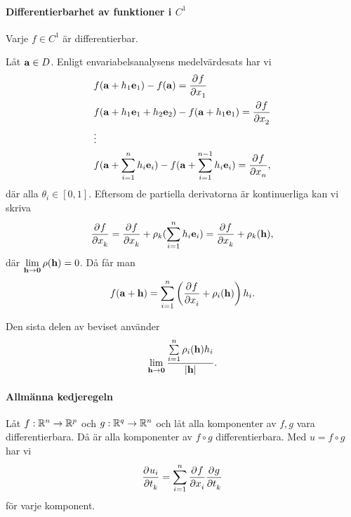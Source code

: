 \paragraph{Differentierbarhet av funktioner i $C^1$}
Varje $f\in C^1$ är differentierbar.

\proof
Låt $\vect{a}\in D$. Enligt envariabelsanalysens medelvärdesats har vi
\begin{align*}
	&f(\vect{a} + h_1\vect{e}_1) - f(\vect{a}) = \pdeval{f}{x_1}{\vect{a} + \theta _1h_1\vect{e}_1} \\
	&f(\vect{a} + h_1\vect{e}_1 + h_2\vect{e}_2) - f(\vect{a} + h_1\vect{e}_1) = \pdeval{f}{x_2}{\vect{a} + h_1\vect{e}_1 + \theta_2h_2\vect{e}_2} \\
	&\vdots \\
	&f(\vect{a} + \sum\limits_{i = 1}^{n}h_i\vect{e}_i) - f(\vect{a} + \sum\limits_{i = 1}^{n - 1}h_i\vect{e}_i) = \pdeval{f}{x_n}{\vect{a} + \sum\limits_{i = 1}^{n - 1}h_i\vect{e}_i + \theta_nh_n\vect{e}_n},
\end{align*}
där alla $\theta_i\in [0, 1]$. Eftersom de partiella derivatorna är kontinuerliga kan vi skriva
\begin{align*}
	\pdeval{f}{x_k}{\vect{a} + \sum\limits_{i = 1}^{k - 1}h_i\vect{e}_i + \theta_kh_k\vect{e}_k} = \pdeval{f}{x_k}{\vect{a}} + \rho_k(\sum\limits_{i = 1}^{n}h_i\vect{e}_i) = \pdeval{f}{x_k}{\vect{a}} + \rho_k(\vect{h}),
\end{align*}
där $\limit{\vect{h}}{\vect{0}}\rho(\vect{h}) = 0$. Då får man
\begin{align*}
	f(\vect{a} + \vect{h}) = \sum\limits_{i = 1}^{n}\left(\pdeval{f}{x_i}{\vect{a}} + \rho_i(\vect{h})\right)h_i.
\end{align*}

Den sista delen av beviset använder
\begin{align*}
	\limit{\vect{h}}{\vect{0}}\frac{\sum\limits_{i = 1}^{n}\rho_i(\vect{h})h_i}{\abs{\vect{h}}}.
\end{align*}

\paragraph{Allmänna kedjeregeln}
Låt $f: \mathbb{R}^n\to\mathbb{R}^p$ och $g: \mathbb{R}^q\to\mathbb{R}^n$ och låt alla komponenter av $f, g$ vara differentierbara. Då är alla komponenter av $f\circ g$ differentierbara. Med $u = f\circ g$ har vi
\begin{align*}
	\pdeval{u_i}{t_k}{\vect{t}} = \sum\limits_{i = 1}^{n}\pdeval{f}{x_i}{g(\vect{t})}\pdeval{g}{t_k}{\vect{t}}
\end{align*}
för varje komponent.

